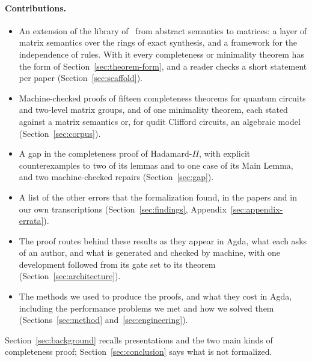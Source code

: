 \paragraph{Contributions.}
\begin{itemize}
\item An extension of the library of~\citet{anonymous2027popl} from
  abstract semantics to matrices: a layer of matrix semantics over the
  rings of exact synthesis, and a framework for the independence of
  rules. With it every completeness or minimality theorem has the form
  of Section~\ref{sec:theorem-form}, and a reader checks a short
  statement per paper (Section~\ref{sec:scaffold}).
\item Machine-checked proofs of fifteen completeness theorems for
  quantum circuits and two-level matrix groups, and of one minimality
  theorem, each stated against a matrix semantics or, for qudit
  Clifford circuits, an algebraic model (Section~\ref{sec:corpus}).
\item A gap in the completeness proof of Hadamard-$\Pi$, with explicit
  counterexamples to two of its lemmas and to one case of its Main
  Lemma, and two machine-checked repairs (Section~\ref{sec:gap}).
\item A list of the other errors that the formalization found, in the
  papers and in our own transcriptions (Section~\ref{sec:findings},
  Appendix~\ref{sec:appendix-errata}).
\item The proof routes behind these results as they appear in Agda,
  what each asks of an author, and what is generated and checked by
  machine, with one development followed from its gate set to its
  theorem (Section~\ref{sec:architecture}).
\item The methods we used to produce the proofs, and what they cost in
  Agda, including the performance problems we met and how we solved
  them (Sections~\ref{sec:method} and~\ref{sec:engineering}).
\end{itemize}

Section~\ref{sec:background} recalls presentations and the two main
kinds of completeness proof; Section~\ref{sec:conclusion} says what is
not formalized.
